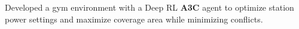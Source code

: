 \item{Developed a gym environment with a Deep RL \textbf{A3C} agent to optimize station power settings and maximize coverage area while minimizing conflicts.}

